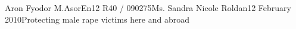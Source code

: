 \documentclass[12pt,letterpaper]{article}
\begin{document}
\begin{mla}{Aron Fyodor M.}{Asor}{En12 R40 / 090275}{Ms. Sandra Nicole Roldan}{12 February 2010}{Protecting male rape victims here and abroad}
%
%




\end{mla}
\end{document}
